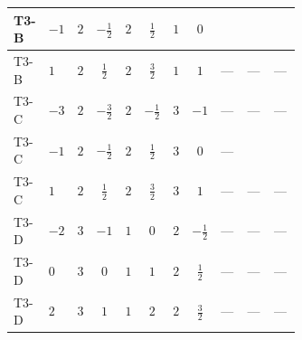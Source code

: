 \documentclass[8pt]{article}
\begin{document}
\begin{landscape}
\begin{longtable}{@{}llcccccc >{\raggedright\arraybackslash}p{0.21\linewidth} >{\raggedright\arraybackslash}p{0.21\linewidth} >{\raggedright\arraybackslash}p{0.21\linewidth}@{}}
T3-B & $-1$ & $2$ & $-\frac{1}{2}$ & $2$ & $\frac{1}{2}$ & $1$ & $0$ & \scriptsize\adjustbox{max width=\linewidth}{$\begin{gathered} {\lambda_{12}^{(1)}} (\operatorname{Tr}\!\left({y_2}\,\left({y_1}\right)^{\dagger}\right)+6 {\lambda_{10}}+6 {\lambda_{11}})\end{gathered}$} & \scriptsize\adjustbox{max width=\linewidth}{$\begin{gathered} +{\lambda_{12}^{(A)}} \left(\frac{1}{12} \operatorname{Tr}\!\left({y_2}\,\left({y_1}\right)^{\dagger}\right)+\frac{5 {\lambda_{10}}}{6}+\frac{{\lambda_{11}}}{6}\right)\end{gathered}$} & \scriptsize\adjustbox{max width=\linewidth}{$\begin{gathered} +{\lambda_{9}} (2 \operatorname{Tr}\!\left({y_1}\,\left({y_2}\right)^{\dagger}\right)+4 (5 \left({\lambda_{10}}\right)^{*}+\left({\lambda_{11}}\right)^{*}))\end{gathered}$} \\
\midrule
T3-B & $1$ & $2$ & $\frac{1}{2}$ & $2$ & $\frac{3}{2}$ & $1$ & $1$ & --- & --- & --- \\
\midrule
T3-C & $-3$ & $2$ & $-\frac{3}{2}$ & $2$ & $-\frac{1}{2}$ & $3$ & $-1$ & --- & --- & --- \\
\midrule
T3-C & $-1$ & $2$ & $-\frac{1}{2}$ & $2$ & $\frac{1}{2}$ & $3$ & $0$ & --- & \scriptsize\adjustbox{max width=\linewidth}{$\begin{gathered} +{\lambda_{12}^{(A)}} \left(\frac{1}{8} \operatorname{Tr}\!\left({y_2}\,\left({y_1}\right)^{\dagger}\right)+\frac{5 {\lambda_{10}}}{6}+\frac{{\lambda_{11}}}{6}\right)\end{gathered}$} & \scriptsize\adjustbox{max width=\linewidth}{$\begin{gathered} +{\lambda_{9}} (3 \operatorname{Tr}\!\left({y_1}\,\left({y_2}\right)^{\dagger}\right)+4 (5 \left({\lambda_{10}}\right)^{*}+\left({\lambda_{11}}\right)^{*}))\end{gathered}$} \\
\midrule
T3-C & $1$ & $2$ & $\frac{1}{2}$ & $2$ & $\frac{3}{2}$ & $3$ & $1$ & --- & --- & --- \\
\midrule
T3-D & $-2$ & $3$ & $-1$ & $1$ & $0$ & $2$ & $-\frac{1}{2}$ & --- & --- & --- \\
\midrule
T3-D & $0$ & $3$ & $0$ & $1$ & $1$ & $2$ & $\frac{1}{2}$ & --- & --- & --- \\
\midrule
T3-D & $2$ & $3$ & $1$ & $1$ & $2$ & $2$ & $\frac{3}{2}$ & --- & --- & --- \\

\end{longtable}
\end{landscape}
\end{document}
